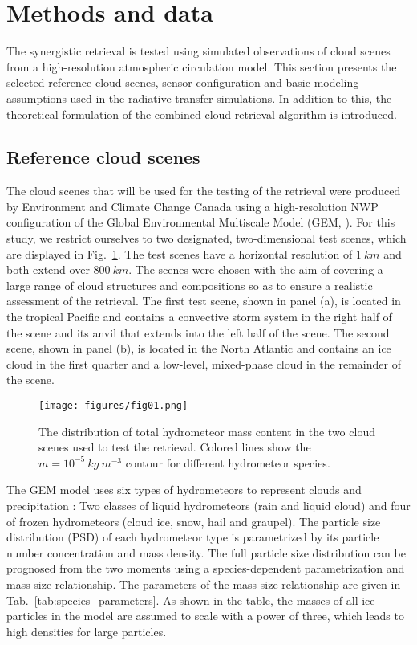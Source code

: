 \documentclass[journal abbreviation, manuscript]{copernicus}
\begin{document}
\section{Methods and data}
\label{sec:methods_and_data}

The synergistic retrieval is tested using simulated observations of cloud scenes
from a high-resolution atmospheric circulation model. This section presents the
selected reference cloud scenes, sensor configuration and basic modeling
assumptions used in the radiative transfer simulations. In addition to this, the
theoretical formulation of the combined cloud-retrieval algorithm is introduced.

\subsection{Reference cloud scenes}

The cloud scenes that will be used for the testing of the retrieval were
produced by Environment and Climate Change Canada using a high-resolution NWP
configuration of the Global Environmental Multiscale Model (GEM, \cite{cote98}).
For this study, we restrict ourselves to two designated, two-dimensional test
scenes, which are displayed in Fig.~\ref{fig:overview}. The test scenes have a
horizontal resolution of $1\ \unit{km}$ and both extend over $800\ \unit{km}$.
The scenes were chosen with the aim of covering a large range of cloud
structures and compositions so as to ensure a realistic assessment of the
retrieval. The first test scene, shown in panel (a), is located in the tropical
Pacific and contains a convective storm system in the right half of the scene
and its anvil that extends into the left half of the scene. The second scene,
shown in panel (b), is located in the North Atlantic and contains an ice cloud
in the first quarter and a low-level, mixed-phase cloud in the remainder of the
scene.

\begin{figure}[h!]
\centering
\texttt{[image: figures/fig01.png]}
\caption{The distribution of total hydrometeor mass content in the two
cloud scenes used to test the retrieval. Colored lines show the
 $m = 10^{-5}\  \unit{kg\ m^{-3}}$ contour for different
 hydrometeor species.}
\label{fig:overview}
\end{figure}


The GEM model uses six types of hydrometeors to represent clouds and
precipitation \citep{milbrandtyau05}: Two classes of liquid hydrometeors (rain
and liquid cloud) and four of frozen hydrometeors (cloud ice, snow, hail and
graupel). The particle size distribution (PSD) of each hydrometeor type is
parametrized by its particle number concentration and mass density. The full
particle size distribution can be prognosed from the two moments using a
species-dependent parametrization and mass-size relationship. The parameters of
the mass-size relationship are given in Tab.~\ref{tab:species_parameters}. As
shown in the table, the masses of all ice particles in the model are
assumed to scale with a power of three, which leads to high densities for
large particles.
\end{document}
